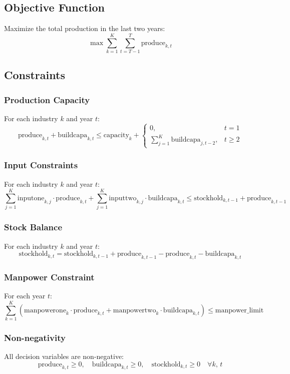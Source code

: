 \documentclass{article}
\begin{document}
\subsection*{Objective Function}
Maximize the total production in the last two years:
\[
\max \sum_{k=1}^{K} \sum_{t=T-1}^{T} \text{produce}_{k,t}
\]

\subsection*{Constraints}

\subsubsection*{Production Capacity}
For each industry \( k \) and year \( t \):
\[
\text{produce}_{k,t} + \text{buildcapa}_{k,t} \leq \text{capacity}_{k} + \begin{cases} 
0, & t = 1 \\
\sum_{j=1}^{K} \text{buildcapa}_{j,t-2}, & t \geq 2
\end{cases}
\]

\subsubsection*{Input Constraints}
For each industry \( k \) and year \( t \):
\[
\sum_{j=1}^{K} \text{inputone}_{k,j} \cdot \text{produce}_{k,t} + \sum_{j=1}^{K} \text{inputtwo}_{k,j} \cdot \text{buildcapa}_{k,t} \leq \text{stockhold}_{k,t-1} + \text{produce}_{k,t-1}
\]

\subsubsection*{Stock Balance}
For each industry \( k \) and year \( t \):
\[
\text{stockhold}_{k,t} = \text{stockhold}_{k,t-1} + \text{produce}_{k,t-1} - \text{produce}_{k,t} - \text{buildcapa}_{k,t}
\]

\subsubsection*{Manpower Constraint}
For each year \( t \):
\[
\sum_{k=1}^{K} \left( \text{manpowerone}_{k} \cdot \text{produce}_{k,t} + \text{manpowertwo}_{k} \cdot \text{buildcapa}_{k,t} \right) \leq \text{manpower\_limit}
\]

\subsubsection*{Non-negativity}
All decision variables are non-negative:
\[
\text{produce}_{k,t} \geq 0, \quad \text{buildcapa}_{k,t} \geq 0, \quad \text{stockhold}_{k,t} \geq 0 \quad \forall k, \, t
\]
\end{document}
